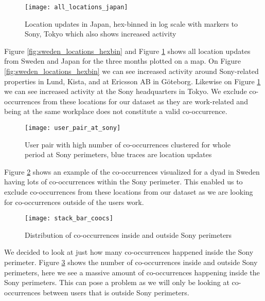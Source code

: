 \begin{figure}[H]
    \hspace*{-1.0cm}
    \centering
    \texttt{[image: all\_locations\_japan]}
    \caption{Location updates in Japan, hex-binned in log scale with markers to Sony, Tokyo which also shows increased activity}
    \label{fig:japan_locations_hexbin}
\end{figure}
Figure \ref{fig:sweden_locations_hexbin} and Figure \ref{fig:japan_locations_hexbin} shows all location updates from Sweden and Japan for the three months plotted on a map. On Figure \ref{fig:sweden_locations_hexbin} we can see increased activity around Sony-related properties in Lund\cite{sony_headquarters_sweden_lund}, Kista\cite{sony_headquarters_sweden_kista}, and at Ericsson AB in Göteborg\cite{ericsson}. Likewise on Figure \ref{fig:japan_locations_hexbin} we can see increased activity at the Sony headquarters\cite{sony_headquarters_japan} in Tokyo. We exclude co-occurrences from these locations for our dataset as they are work-related and being at the same workplace does not constitute a valid co-occurrence.

\begin{figure}[H]
    \hspace*{-1.0cm}
    \centering
    \texttt{[image: user\_pair\_at\_sony]}
    \caption{User pair with high number of co-occurrences clustered for whole period at Sony perimeters, blue traces are location updates}
    \label{fig:user_pair_at_sony}
\end{figure}
Figure \ref{fig:user_pair_at_sony} shows an example of the co-occurrences visualized for a dyad in Sweden having lots of co-occurrences within the Sony perimeter. This enabled us to exclude co-occurrences from these locations from our dataset as we are looking for co-occurrences outside of the users work.


\begin{figure}[H]
    \hspace*{-1.0cm}
    \centering
    \texttt{[image: stack\_bar\_coocs]}
    \caption{Distribution of co-occurrences inside and outside Sony perimeters}
    \label{fig:dist_coocs_sony}
\end{figure}

We decided to look at just how many co-occurrences happened inside the Sony perimeter. Figure \ref{fig:dist_coocs_sony} shows the number of co-occurrences inside and outside Sony perimeters, here we see a massive amount of co-occurrences happening inside the Sony perimeters. This can pose a problem as we will only be looking at co-occurrences between users that is outside Sony perimeters.

